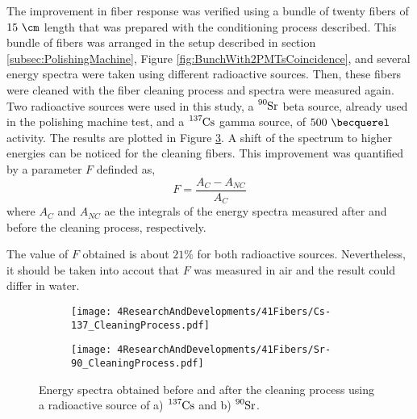 The improvement in fiber response was verified using a bundle of twenty fibers of $15~\cm$ length  that was prepared with the conditioning process described. This bundle of fibers was arranged in the setup described in section \ref{subsec:PolishingMachine}, Figure \ref{fig:BunchWith2PMTsCoincidence}, and several energy spectra were taken using different radioactive sources. Then, these fibers were cleaned with the fiber cleaning process and spectra were measured again. Two radioactive sources were used in this study, a $\ce{^{90}Sr}$ beta source, already used in the polishing machine test, and a $\ce{^{137}Cs}$ gamma source, of $500~\becquerel$ activity. The results are plotted in Figure \ref{fig:ResultsOfCleaningProcess}. A shift of the spectrum to higher energies can be noticed for the cleaning fibers. This improvement was quantified by a parameter $F$ definded as,
\begin{equation}
F=\frac{A_{C}-A_{NC}}{A_{C}}
\label{eq:RelativeImprovement}
\end{equation}
where $A_{C}$ and $A_{NC}$ ae the integrals of the energy spectra measured after and before the cleaning process, respectively.

The value of $F$ obtained is about $21\%$ for both radioactive sources. Nevertheless, it should be taken into accout that $F$ was measured in air and the result could differ in water.

\begin{figure}
\centering
    \begin{subfigure}[b]{1\textwidth}
    \centering
    \texttt{[image: 4ResearchAndDevelopments/41Fibers/Cs-137\_CleaningProcess.pdf]}  
    \caption{\label{subfig:EnergySpectrumCo60CleaningTest}}
    \end{subfigure}
    \hfill
    \begin{subfigure}[b]{1\textwidth}
    \centering
    \texttt{[image: 4ResearchAndDevelopments/41Fibers/Sr-90\_CleaningProcess.pdf]}  
    \caption{\label{subfig:EnergySpectrumSr90CleaningTest}}
    \end{subfigure}
 \caption{Energy spectra obtained before and after the cleaning process using a radioactive source of a) $\ce{^{137}Cs}$ and b) $\ce{^{90}Sr}$.}
 \label{fig:ResultsOfCleaningProcess}
\end{figure}


